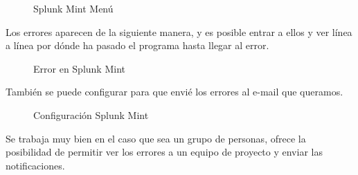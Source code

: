 \begin{figure}[H] 
  \begin{center} 
    \caption{Splunk Mint Menú} 
    \label{fig:SplunkMintMenu} 
  \end{center} 
\end{figure}

Los errores aparecen de la siguiente manera, y es posible entrar a ellos y ver línea a línea por dónde ha pasado el programa hasta llegar al error.

\begin{figure}[H] 
  \begin{center} 
    \caption{Error en Splunk Mint} 
    \label{fig:ErrorSplunkMint} 
  \end{center} 
\end{figure}

También se puede configurar para que envié los errores al e-mail que queramos.

\begin{figure}[H] 
  \begin{center} 
    \caption{Configuración  Splunk Mint} 
    \label{fig:ConfiguracionSplunkMint} 
  \end{center} 
\end{figure}

Se trabaja muy bien en el caso que sea un grupo de personas, ofrece la posibilidad de permitir ver los errores a un equipo de proyecto y enviar las notificaciones.

